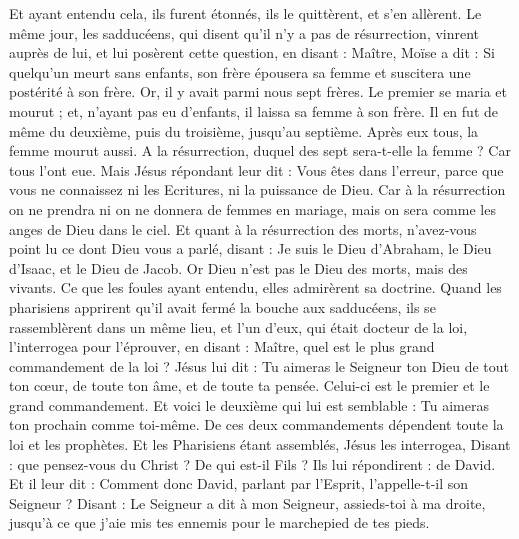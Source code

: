 \begin{multicols}{2}
Et ayant entendu cela, ils furent étonnés, ils le quittèrent, et s'en allèrent.
Le même jour, les sadducéens, qui disent qu'il n'y a pas de résurrection, vinrent auprès de lui, et lui posèrent cette question,
en disant : Maître, Moïse a dit : Si quelqu'un meurt sans enfants, son frère épousera sa femme et suscitera une postérité à son frère.
Or, il y avait parmi nous sept frères. Le premier se maria et mourut ; et, n'ayant pas eu d'enfants, il laissa sa femme à son frère.
Il en fut de même du deuxième, puis du troisième, jusqu'au septième.
Après eux tous, la femme mourut aussi.
A la résurrection, duquel des sept sera-t-elle la femme ? Car tous l'ont eue.
Mais Jésus répondant leur dit : Vous êtes dans l'erreur, parce que vous ne connaissez ni les Ecritures, ni la puissance de Dieu.
Car à la résurrection on ne prendra ni on ne donnera de femmes en mariage, mais on sera comme les anges de Dieu dans le ciel.
Et quant à la résurrection des morts, n'avez-vous point lu ce dont Dieu vous a parlé, disant :
Je suis le Dieu d'Abraham, le Dieu d'Isaac, et le Dieu de Jacob. Or Dieu n'est pas le Dieu des morts, mais des vivants.
Ce que les foules ayant entendu, elles admirèrent sa doctrine.
Quand les pharisiens apprirent qu'il avait fermé la bouche aux sadducéens, ils se rassemblèrent dans un même lieu,
et l'un d'eux, qui était docteur de la loi, l'interrogea pour l'éprouver, en disant :
Maître, quel est le plus grand commandement de la loi ?
Jésus lui dit : Tu aimeras le Seigneur ton Dieu de tout ton cœur, de toute ton âme, et de toute ta pensée.
Celui-ci est le premier et le grand commandement.
Et voici le deuxième qui lui est semblable : Tu aimeras ton prochain comme toi-même.
De ces deux commandements dépendent toute la loi et les prophètes.
Et les Pharisiens étant assemblés, Jésus les interrogea,
Disant : que pensez-vous du Christ ? De qui est-il Fils ? Ils lui répondirent : de David.
Et il leur dit : Comment donc David, parlant par l'Esprit, l'appelle-t-il son Seigneur ? Disant :
Le Seigneur a dit à mon Seigneur, assieds-toi à ma droite, jusqu'à ce que j'aie mis tes ennemis pour le marchepied de tes pieds.

\end{multicols}
